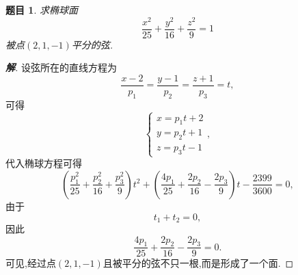 \documentclass[a4paper]{article}
\newtheorem*{exe}{题目}
\newenvironment{exercise}
{\bigskip\begin{mdframed}\begin{exe}}
    {\end{exe}\end{mdframed}\bigskip}
\begin{document}
\begin{exercise}
求椭球面
$$
\frac{x^2}{25}+\frac{y^2}{16}+\frac{z^2}{9}=1
$$
被点$(2,1,-1)$平分的弦.
\end{exercise}
\begin{proof}[\textbf{解}]
设弦所在的直线方程为
\begin{equation}
  \label{eq:1}
  \frac{x-2}{p_{1}}=\frac{y-1}{p_{2}}=\frac{z+1}{p_{3}}=t,
\end{equation}
可得
$$
\begin{cases}
  x=p_1t+2\\
y=p_2t+1\\
z=p_3t-1
\end{cases},
$$
代入椭球方程可得
$$
(\frac{p_1^2}{25}+\frac{p_2^2}{16}+\frac{p_3^2}{9})t^2+(\frac{4p_1}{25}+\frac{2p_2}{16}-\frac{2p_3}{9})t-\frac{2399}{3600}=0,
$$
由于
$$
t_1+t_2=0,
$$
因此
$$
\frac{4p_1}{25}+\frac{2p_2}{16}-\frac{2p_3}{9}=0.
$$
可见,经过点$(2,1,-1)$且被平分的弦不只一根,而是形成了一个面.
\end{proof}
\end{document}
